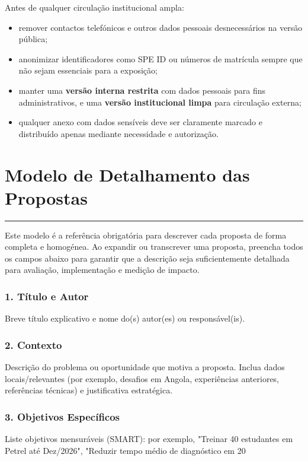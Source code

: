 \documentclass[12pt,a4paper]{article}
\begin{document}
\noindent Antes de qualquer circulação institucional ampla:
\begin{itemize}
    \item remover contactos telefónicos e outros dados pessoais desnecessários na versão pública;
    \item anonimizar identificadores como SPE ID ou números de matrícula sempre que não sejam essenciais para a exposição;
    \item manter uma \textbf{versão interna restrita} com dados pessoais para fins administrativos, e uma \textbf{versão institucional limpa} para circulação externa;
    \item qualquer anexo com dados sensíveis deve ser claramente marcado e distribuído apenas mediante necessidade e autorização.
\end{itemize}


\clearpage
\section*{Modelo de Detalhamento das Propostas}
\textcolor{spe-secondary}{\rule{\linewidth}{0.5pt}}

Este modelo é a referência obrigatória para descrever cada proposta de forma completa e homogénea. Ao expandir ou transcrever uma proposta, preencha todos os campos abaixo para garantir que a descrição seja suficientemente detalhada para avaliação, implementação e medição de impacto.

\subsubsection*{1. Título e Autor}
Breve título explicativo e nome do(s) autor(es) ou responsável(is).

\subsubsection*{2. Contexto}
Descrição do problema ou oportunidade que motiva a proposta. Inclua dados locais/relevantes (por exemplo, desafios em Angola, experiências anteriores, referências técnicas) e justificativa estratégica.

\subsubsection*{3. Objetivos Específicos}
Liste objetivos mensuráveis (SMART): por exemplo, "Treinar 40 estudantes em Petrel até Dez/2026", "Reduzir tempo médio de diagnóstico em 20%
\end{document}
